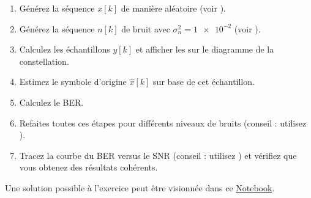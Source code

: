 \documentclass [a4paper, 11pt] {article}
\begin{document}
\begin{exercice}{1}
        \begin{enumerate}
            \item Générez la séquence $x[k]$ de manière aléatoire (voir \href{https://numpy.org/doc/stable/reference/random/generated/numpy.random.randint.html}{}).
            \item Générez la séquence $n[k]$ de bruit avec $\sigma_n^2 = \num{1e-2}$ (voir \href{https://numpy.org/doc/stable/reference/random/generated/numpy.random.randn.html}{}).
            \item Calculez les échantillons $y[k]$ et afficher les sur le diagramme de la constellation.
            \item Estimez le symbole d'origine $\hat{x}[k]$ sur base de cet échantillon.
            \item Calculez le BER.
            \item Refaites toutes ces étapes pour différents niveaux de bruits (conseil : utilisez ).
            \item Tracez la courbe du BER versus le SNR (conseil : utilisez ) et vérifiez que vous obtenez des résultats cohérents.
        \end{enumerate}
    
    \end{exercice}
    
    \begin{reponse}
        Une solution possible à l'exercice peut être visionnée dans ce \href{https://github.com/jeertmans/LELEC1930/blob/main/notebooks/seance4.ipynb}{Notebook}.
    \end{reponse}
    
\end{document}
